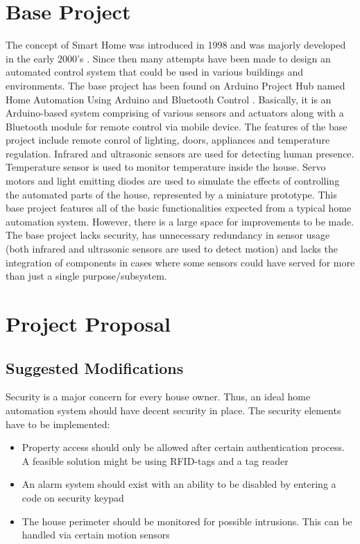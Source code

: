 \documentclass[journal]{IEEEtran}
\begin{document}
\section{Base Project}
The concept of Smart Home was introduced in 1998 and was majorly developed in the early 2000’s \textsuperscript{\cite{IEEEhowto:Hendricks}}. Since then many attempts have been made to design an automated control system that could be used in various buildings and environments. The base project has been found on Arduino Project Hub named Home Automation Using Arduino and Bluetooth Control \textsuperscript{\cite{IEEEhowto:Kumar}}. Basically, it is an Arduino-based system comprising of various sensors and actuators along with a Bluetooth module for remote control via mobile device. The features of the base project include remote conrol of lighting, doors, appliances and temperature regulation. Infrared and ultrasonic sensors are used for detecting human presence. Temperature sensor is used to monitor temperature inside the house. Servo motors and light emitting diodes are used to simulate the effects of controlling the automated parts of the house, represented by a miniature prototype.
This base project features all of the basic functionalities expected from a typical home automation system. However, there is a large space for improvements to be made. The base project lacks security, has unnecessary redundancy in sensor usage (both infrared and ultrasonic sensors are used to detect motion) and lacks the integration of components in cases where some sensors could have served for more than just a single purpose/subsystem.

\section{Project Proposal}

\subsection{Suggested Modifications}
Security is a major concern for every house owner. Thus, an ideal home automation system should have decent security in place. The security elements have to be implemented:
\begin{itemize}
    \item {Property access should only be allowed after certain authentication process. A feasible solution might be using RFID-tags and a tag reader}
    \item {An alarm system should exist with an ability to be disabled by entering a code on security keypad}
    \item {The house perimeter should be monitored for possible intrusions. This can be handled via certain motion sensors}
\end{itemize}
\end{document}
